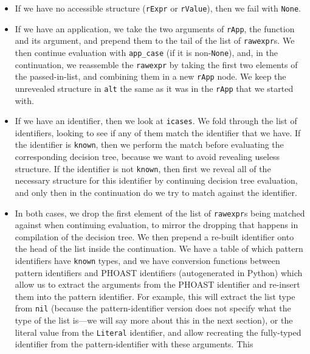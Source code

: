 \begin{itemize}
\begin{itemize}
    \begin{itemize}
    \tightlist
    \item
      If we have no accessible structure (\texttt{rExpr} or
      \texttt{rValue}), then we fail with \texttt{None}.
    \item
      If we have an application, we take the two arguments of
      \texttt{rApp}, the function and its argument, and prepend them to
      the tail of the list of \texttt{rawexpr}s. We then continue
      evaluation with \texttt{app\_case} (if it is non-\texttt{None}),
      and, in the continuation, we reassemble the \texttt{rawexpr} by
      taking the first two elements of the passed-in-list, and combining
      them in a new \texttt{rApp} node. We keep the unrevealed structure
      in \texttt{alt} the same as it was in the \texttt{rApp} that we
      started with.
    \item
      If we have an identifier, then we look at \texttt{icases}. We fold
      through the list of identifiers, looking to see if any of them
      match the identifier that we have. If the identifier is
      \texttt{known}, then we perform the match before evaluating the
      corresponding decision tree, because we want to avoid revealing
      useless structure. If the identifier is not \texttt{known}, then
      first we reveal all of the necessary structure for this identifier
      by continuing decision tree evaluation, and only then in the
      continuation do we try to match against the identifier.
    \item
      In both cases, we drop the first element of the list of
      \texttt{rawexpr}s being matched against when continuing
      evaluation, to mirror the dropping that happens in compilation of
      the decision tree. We then prepend a re-built identifier onto the
      head of the list inside the continuation. We have a table of which
      pattern identifiers have \texttt{known} types, and we have
      conversion functions between pattern identifiers and PHOAST
      identifiers (autogenerated in Python) which allow us to extract
      the arguments from the PHOAST identifier and re-insert them into
      the pattern identifier. For example, this will extract the list
      type from \texttt{nil} (because the pattern-identifier version
      does not specify what the type of the list is---we will say more
      about this in the next section), or the literal value from the
      \texttt{Literal} identifier, and allow recreating the fully-typed
      identifier from the pattern-identifier with these arguments. This

\end{itemize}
\end{itemize}
\end{itemize}
